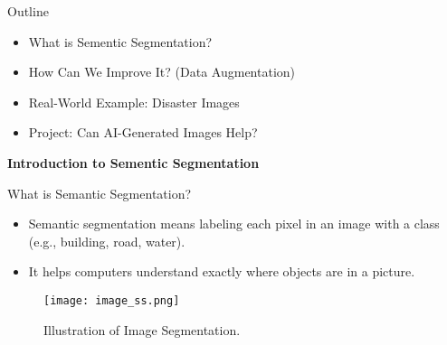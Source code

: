 
\begin{frame}{Outline}
  \begin{itemize}
    \item What is Sementic Segmentation?
    \item How Can We Improve It? (Data Augmentation)
    \item Real-World Example: Disaster Images
    \item Project: Can AI-Generated Images Help?
  \end{itemize}
\end{frame}

\begin{refsection}
  \begin{frame}
    \centering
    \vspace{2.5cm}
    {\LARGE \textbf{Introduction to Sementic Segmentation}}
  \end{frame}
\end{refsection}

\begin{refsection}
  \begin{frame}{What is Semantic Segmentation?}
    \begin{itemize}
      \item Semantic segmentation means labeling each pixel in an image with a class (e.g., building, road, water).
      \item It helps computers understand exactly where objects are in a picture.
    \end{itemize}
    \begin{figure}
      \centering
      \texttt{[image: image\_ss.png]}
      \caption[]{\scriptsize Illustration of Image Segmentation.}
    \end{figure}

  \end{frame}
\end{refsection}


